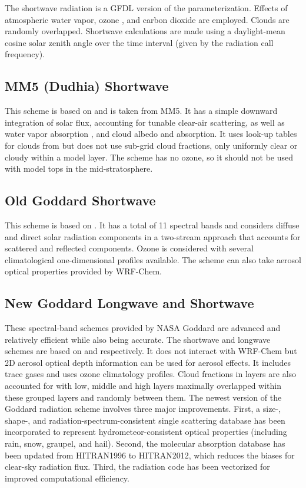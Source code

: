 The shortwave radiation is a GFDL version of the \citet{lacis74}
parameterization. Effects of atmospheric water vapor, ozone 
\citep[both from][]{lacis74}, and carbon dioxide \citep{sasamori72}
are employed. Clouds are randomly overlapped. Shortwave calculations are made 
using a daylight-mean cosine solar zenith angle over the time interval 
(given by the radiation call frequency). 

\subsection {MM5 (Dudhia) Shortwave}

This scheme is based on \citet{dudhia89} and is taken from MM5. It has a simple 
downward integration of solar flux, accounting for tunable clear-air scattering, as well as 
water vapor absorption \citep{lacis74}, and cloud albedo and absorption. 
It uses look-up tables for clouds from \citet{stephens78} but does not use
sub-grid cloud fractions, only uniformly clear or cloudy within a model layer. The scheme
has no ozone, so it should not be used with model tops in the mid-stratosphere.

\subsection {Old Goddard Shortwave}

This scheme is based on \citet{chou94}. It has a total of 11 spectral 
bands and considers diffuse and direct solar radiation components in a two-stream 
approach that accounts for scattered and reflected components. Ozone is considered 
with several climatological one-dimensional profiles available. The scheme can also take
aerosol optical properties provided by WRF-Chem.

\subsection {New Goddard Longwave and Shortwave}

These spectral-band schemes provided by NASA Goddard are advanced and relatively efficient while also being accurate.
The shortwave and longwave schemes are based on \citet{chou99} and \citet{chou01}
respectively. It does not interact with WRF-Chem but 2D aerosol optical depth
information can be used for aerosol effects. It includes trace gases and uses
ozone climatology profiles. Cloud fractions in layers are also accounted for with
low, middle and high layers maximally overlapped within these grouped layers and randomly between
them. The newest version of the Goddard radiation scheme \citep{matsui18} involves three major improvements.  First, a size-, shape-, and radiation-spectrum-consistent single scattering database \citep{yang13} has been incorporated to represent hydrometeor-consistent optical properties (including rain, snow, graupel, and hail). Second, the molecular absorption database has been updated from HITRAN1996 to HITRAN2012, which reduces the biases for clear-sky radiation flux.  Third, the radiation code has been vectorized for improved computational efficiency.

